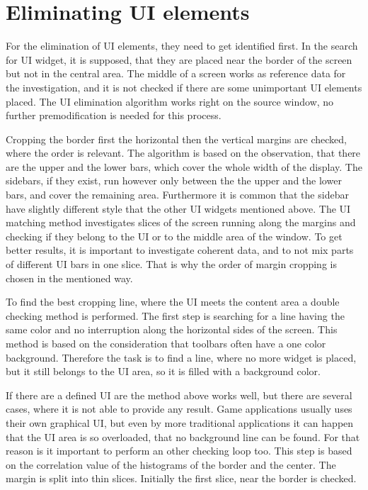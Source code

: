 \documentclass[draft,final]{vutinfth} %
\begin{document}
\section{Eliminating UI elements}
For the elimination of UI elements, they need to get identified first.
In the search for UI widget, it is supposed, that they are placed near the border of the screen but not in the central area.
The middle of a screen works as reference data for the investigation, and it is not checked if there are some unimportant UI elements placed.
The UI elimination algorithm works right on the source window, no further premodification is needed for this process.\par
Cropping the border first the horizontal then the vertical margins are checked, where the order is relevant.
The algorithm is based on the observation, that there are the upper and the lower bars, which cover the whole width of the display.
The sidebars, if they exist, run however only between the the upper and the lower bars, and cover the remaining area.
Furthermore it is common that the sidebar have slightly different style that the other UI widgets mentioned above.
The UI matching method investigates slices of the screen running along the margins and checking if they belong to the UI or to the middle area of the window.
To get better results, it is important to investigate coherent data, and to not mix parts of different UI bars in one slice.
That is why the order of margin cropping is chosen in the mentioned way.\par 
To find the best cropping line, where the UI meets the content area a double checking method is performed.
The first step is searching for a line having the same color and no interruption along the horizontal sides of the screen.
This method is based on the consideration that toolbars often have a one color background.
Therefore the task is to find a line, where no more widget is placed, but it still belongs to the UI area, so it is filled with a background color.\par
If there are a defined UI are the method above works well, but there are several cases, where it is not able to provide any result.
Game applications usually uses their own graphical UI, but even by more traditional applications it can happen that the UI area is so overloaded, that no background line can be found.
For that reason is it important to perform an other checking loop too.
This step is based on the correlation value of the histograms of the border and the center.
The margin is split into thin slices.
Initially the first slice, near the border is checked.
\end{document}
